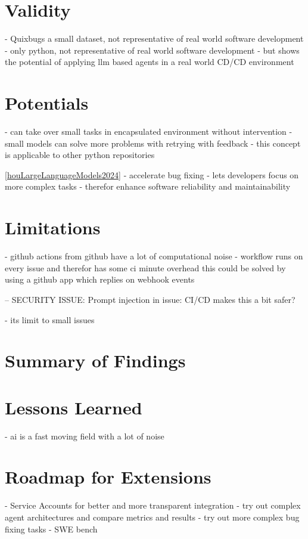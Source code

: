 \section{Validity}
- Quixbugs a small dataset, not representative of real world software development
- only python, not representative of real world software development
- but shows the potential of applying llm based agents in a real world CD/CD environment

\section{Potentials}
- can take over small tasks in encapsulated environment without intervention
- small models can solve more problems with retrying with feedback
- this concept is applicable to other python repositories

\ref{houLargeLanguageModels2024}
- accelerate bug fixing
- lets developers focus on more complex tasks
- therefor enhance software reliability and maintainability

\section{Limitations}
- github actions from github have a lot of computational noise
- workflow runs on every issue and therefor has some ci minute overhead this could be solved by using a github app which replies on webhook events

-- SECURITY ISSUE: Prompt injection in issue: CI/CD makes this a bit safer?

- its limit to small issues

\section{Summary of Findings}
\section{Lessons Learned}
- ai is a fast moving field with a lot of noise


\section{Roadmap for Extensions}
- Service Accounts for better and more transparent integration
- try out complex agent architectures and compare metrics and results
- try out more complex bug fixing tasks - SWE bench